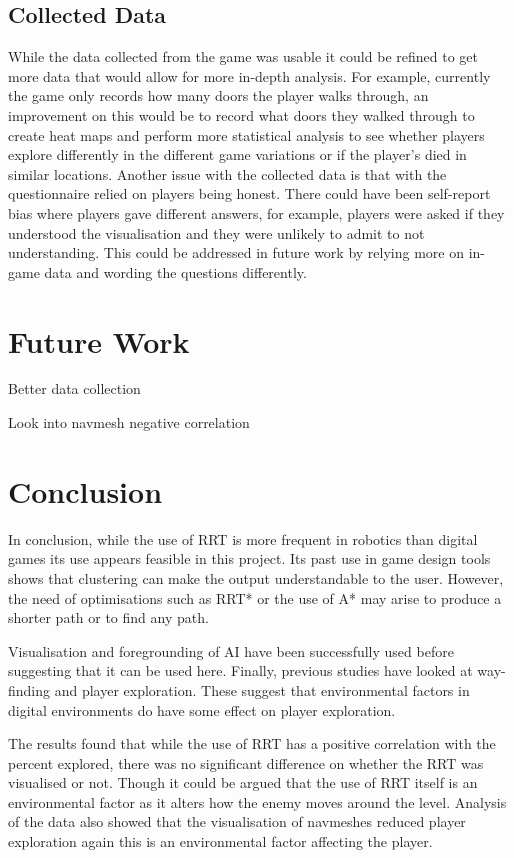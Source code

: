 \documentclass[journal]{IEEEtran}
\begin{document}
	\subsection{Collected Data}    
	While the data collected from the game was usable it could be refined to get more data that would allow for more in-depth analysis. For example, currently the game only records how many doors the player walks through, an improvement on this would be to record what doors they walked through to create heat maps and perform more statistical analysis to see whether players explore differently in the different game variations or if the player's died in similar locations.
	Another issue with the collected data is that with the questionnaire relied on players being honest. There could have been self-report bias where players gave different answers, for example, players were asked if they understood the visualisation and they were unlikely to admit to not understanding. This could be addressed in future work by relying more on in-game data and wording the questions differently.
    
    \section{Future Work} 
	Better data collection 
	
	Look into navmesh negative correlation 
	
	\section{Conclusion} 
	In conclusion, while the use of RRT is more frequent in robotics than digital games its use appears feasible in this project. Its past use in game design tools shows that clustering can make the output understandable to the user. However, the need of optimisations such as RRT* or the use of A* may arise to produce a shorter path or to find any path. 
	
	Visualisation and foregrounding of AI have been successfully used before suggesting that it can be used here. Finally, previous studies have looked at way-finding and player exploration. These suggest that environmental factors in digital environments do have some effect on player exploration.
	
	The results found that while the use of RRT has a positive correlation with the percent explored, there was no significant difference on whether the RRT was visualised or not.  Though it could be argued that the use of RRT itself is an environmental factor as it alters how the enemy moves around the level.  Analysis of the data also showed that the visualisation of navmeshes reduced player exploration again this is an environmental factor affecting the player.
	
\end{document}
